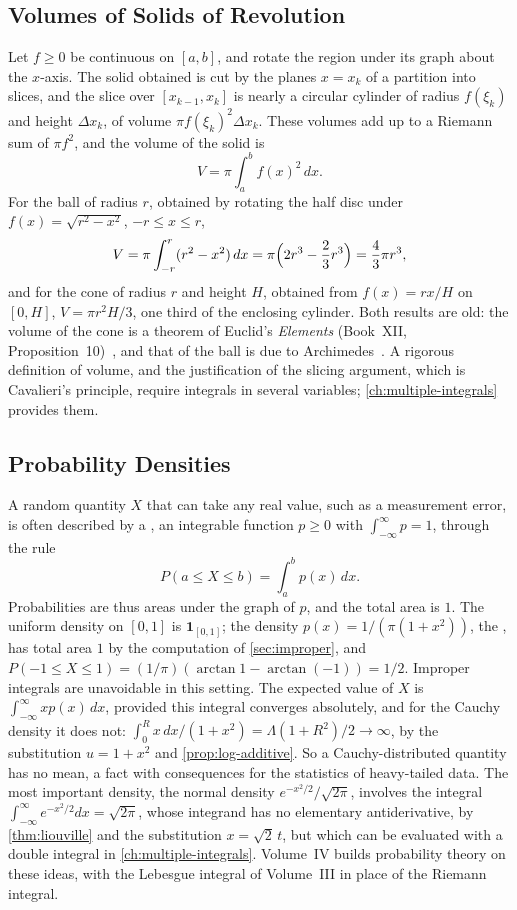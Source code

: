 \subsection{Volumes of Solids of Revolution}

Let $f\ge0$ be continuous on $[a,b]$, and rotate the region under its graph about the $x$-axis. The solid obtained is cut by the planes $x=x_k$ of a partition into slices, and the slice over $[x_{k-1},x_k]$ is nearly a circular cylinder of radius $f(\xi_k)$ and height $\Delta x_k$, of volume $\pi f(\xi_k)^2\Delta x_k$. These volumes add up to a Riemann sum of $\pi f^2$, and the volume of the solid is
\[
V=\pi\int_a^bf(x)^2\,dx .
\]
For the ball of radius $r$, obtained by rotating the half disc under $f(x)=\sqrt{r^2-x^2}$, $-r\le x\le r$,
\[
V=\pi\int_{-r}^r(r^2-x^2)\,dx=\pi\Bigl(2r^3-\frac23r^3\Bigr)=\frac43\pi r^3 ,
\]
and for the cone of radius $r$ and height $H$, obtained from $f(x)=rx/H$ on $[0,H]$, $V=\pi r^2H/3$, one third of the enclosing cylinder. Both results are old: the volume of the cone is a theorem of Euclid's \emph{Elements} (Book~XII, Proposition~10)~\cite{heath1956euclid}, and that of the ball is due to Archimedes~\cite{heath1897archimedes}. A rigorous definition of volume, and the justification of the slicing argument, which is Cavalieri's principle, require integrals in several variables; \cref{ch:multiple-integrals} provides them.

\subsection{Probability Densities}

A random quantity $X$ that can take any real value, such as a measurement error, is often described by a , an integrable function $p\ge0$ with $\int_{-\infty}^\infty p=1$, through the rule
\[
P(a\le X\le b)=\int_a^bp(x)\,dx .
\]
Probabilities are thus areas under the graph of $p$, and the total area is $1$. The uniform density on $[0,1]$ is $\mathbf 1_{[0,1]}$; the density $p(x)=1/(\pi(1+x^2))$, the , has total area $1$ by the computation of \cref{sec:improper}, and $P(-1\le X\le1)=(1/\pi)(\arctan1-\arctan(-1))=1/2$. Improper integrals are unavoidable in this setting. The expected value of $X$ is $\int_{-\infty}^\infty xp(x)\,dx$, provided this integral converges absolutely, and for the Cauchy density it does not: $\int_0^Rx\,dx/(1+x^2)=\Lambda(1+R^2)/2\to\infty$, by the substitution $u=1+x^2$ and \cref{prop:log-additive}. So a Cauchy-distributed quantity has no mean, a fact with consequences for the statistics of heavy-tailed data. The most important density, the normal density $e^{-x^2/2}/\sqrt{2\pi}$, involves the integral $\int_{-\infty}^\infty e^{-x^2/2}dx=\sqrt{2\pi}$, whose integrand has no elementary antiderivative, by \cref{thm:liouville} and the substitution $x=\sqrt2\,t$, but which can be evaluated with a double integral in \cref{ch:multiple-integrals}. Volume~IV builds probability theory on these ideas, with the Lebesgue integral of Volume~III in place of the Riemann integral.

